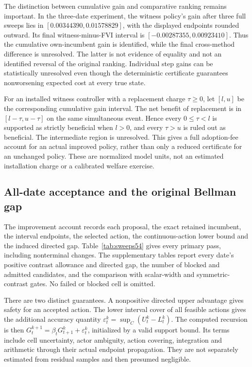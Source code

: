 


The distinction between cumulative gain and comparative ranking remains important. In the three-date experiment, the witness policy's gain after three full sweeps lies in $[0.00344390,0.01578829]$, with the displayed endpoints rounded outward. Its final witness-minus-FVI interval is $[-0.00287355,0.00923410]$. Thus the cumulative own-incumbent gain is identified, while the final cross-method difference is unresolved. The latter is not evidence of equality and not an identified reversal of the original ranking. Individual step gains can be statistically unresolved even though the deterministic certificate guarantees nonworsening expected cost at every true state.

For an installed witness controller with a replacement charge $\tau\ge0$, let $[l,u]$ be the corresponding cumulative gain interval. The net benefit of replacement is in $[l-\tau,u-\tau]$ on the same simultaneous event. Hence every $0\le\tau<l$ is supported as strictly beneficial when $l>0$, and every $\tau>u$ is ruled out as beneficial. The intermediate region is unresolved. This gives a full adoption-fee account for an actual improved policy, rather than only a reduced certificate for an unchanged policy. These are normalized model units, not an estimated installation charge or a calibrated welfare exercise.

\subsection{All-date acceptance and the original Bellman gap}
The improvement account records each proposal, the exact retained incumbent, the interval endpoints, the selected action, the continuous-action lower bound and the induced directed gap. Table~\ref{tab:sweeps54} gives every primary pass, including nonterminal changes. The supplementary tables report every date's positive contrast allowance and directed gap, the number of blocked and admitted candidates, and the comparison with scalar-width and symmetric-contrast gates. No failed or blocked cell is omitted.



There are two distinct guarantees. A nonpositive directed upper advantage gives safety for an accepted action. The lower interval cover of all feasible actions gives the additional accuracy quantity $\varepsilon_t^k=\sup_C(U_t^k-L_t^k)$. The computed recursion is then $G_t^{k+1}=\beta_tG_{t+1}^k+\varepsilon_t^k$, initialized by a valid support bound. Its terms include cell uncertainty, actor ambiguity, action covering, integration and arithmetic through their actual endpoint propagation. They are not separately estimated from residual samples and then presumed negligible.

